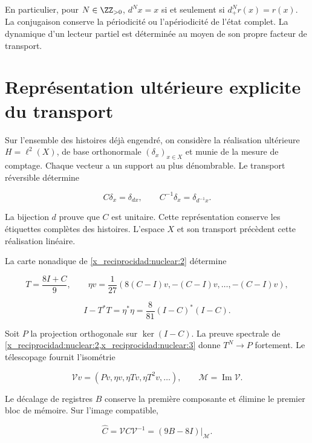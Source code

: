 En particulier, pour \(N\in\ZZ_{>0}\),
\(d^Nx=x\) si et seulement si \(d_+^Nr(x)=r(x)\).
La conjugaison conserve la périodicité ou l’apériodicité de l’état
complet. La dynamique d’un lecteur partiel est déterminée au moyen
de son propre facteur de transport.

\section{Représentation ultérieure explicite du transport}

Sur l’ensemble des histoires déjà engendré, on considère la réalisation
ultérieure \(H=\ell^2(X)\), de base orthonormale
\((\delta_x)_{x\in X}\) et munie de la mesure de comptage. Chaque vecteur a un support
au plus dénombrable. Le transport réversible détermine



\[
C\delta_x=\delta_{d x},\qquad C^{-1}\delta_x=\delta_{d^{-1}x}.
\]



La bijection \(d\) prouve que \(C\) est unitaire.
Cette représentation conserve les étiquettes complètes des histoires.
L’espace \(X\) et son transport précèdent cette réalisation linéaire.

La carte nonadique de \cref{x_reciprocidad:nuclear:2} détermine



\[
T=\frac{8I+C}{9},\qquad
\eta v=\frac1{27}(8(C-I)v,-(C-I)v,\ldots,-(C-I)v),
\]





\[
I-T^*T=\eta^*\eta=\frac8{81}(I-C)^*(I-C).
\]



Soit \(P\) la projection orthogonale sur \(\ker(I-C)\).
La preuve spectrale de \cref{x_reciprocidad:nuclear:2,x_reciprocidad:nuclear:3} donne
\(T^N\to P\) fortement. Le télescopage fournit l’isométrie



\[
\mathcal Vv=(Pv,\eta v,\eta Tv,\eta T^2v,\ldots),\qquad
\mathcal M=\operatorname{Im}\mathcal V.
\]



Le décalage de registres \(B\) conserve la première composante
et élimine le premier bloc de mémoire. Sur l’image compatible,



\begin{equation}
\boxed{\widehat C=\mathcal VC\mathcal V^{-1}
=(9B-8I)|_{\mathcal M}.}
\label{x_reciprocidad:nuc09:transporte-recuperado}
\end{equation}




